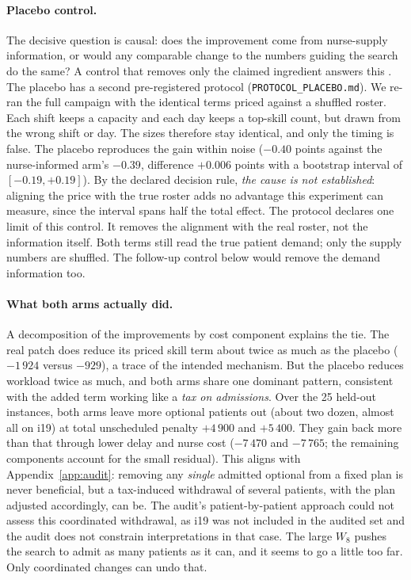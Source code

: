 \documentclass[11pt]{article}
\begin{document}
	\paragraph{Placebo control.} The decisive question is causal: does the improvement come from
	nurse-supply information, or would any comparable change to the numbers guiding the search do
	the same? A control that removes only the claimed ingredient answers this \citep{shadish2002}.
	The placebo has a second pre-registered protocol (\texttt{PROTOCOL\_PLACEBO.md}). We re-ran the full campaign with the identical terms priced against a shuffled roster. Each shift keeps a capacity and each day keeps a top-skill count, but drawn from the wrong shift or day. The sizes therefore stay identical, and only the timing is false. The placebo
	reproduces the gain within noise ($-0.40$ points against the nurse-informed arm's $-0.39$,
	difference $+0.006$ points with a bootstrap interval of $[-0.19, +0.19]$). By the declared decision rule, \emph{the cause is not established}: aligning the price with the true roster adds no advantage this experiment can measure, since the interval spans half the total effect. The protocol declares one limit of this control. It removes the alignment with the real roster, not the information itself. Both terms still read the true patient demand; only the supply numbers are shuffled. The follow-up control below would remove the demand information too.

	\paragraph{What both arms actually did.} A decomposition of the improvements by cost component explains
	the tie. The real patch does reduce its priced skill term about twice as much as the placebo
	($-1\,924$ versus $-929$), a trace of the intended mechanism. But the placebo reduces workload
	twice as much, and both arms share one dominant pattern, consistent with the added term working like a \emph{tax on admissions}. Over the 25 held-out instances, both arms leave more
	optional patients out (about two dozen, almost all on i19) at total unscheduled penalty
	$+4\,900$ and $+5\,400$. They gain back more than that through lower delay and nurse cost
	($-7\,470$ and $-7\,765$; the remaining components account for the small residual). This aligns with Appendix~\ref{app:audit}: removing any \emph{single} admitted optional from a
	fixed plan is never beneficial, but a tax-induced withdrawal of several patients, with the plan adjusted accordingly, can be. The audit’s patient-by-patient approach could not assess this coordinated withdrawal, as i19 was not included in the audited set and the audit does not constrain interpretations in that case.
	The large $W_8$ pushes the search to admit as many patients as it can, and it seems to go a little too far. Only coordinated changes can undo that.
\end{document}
